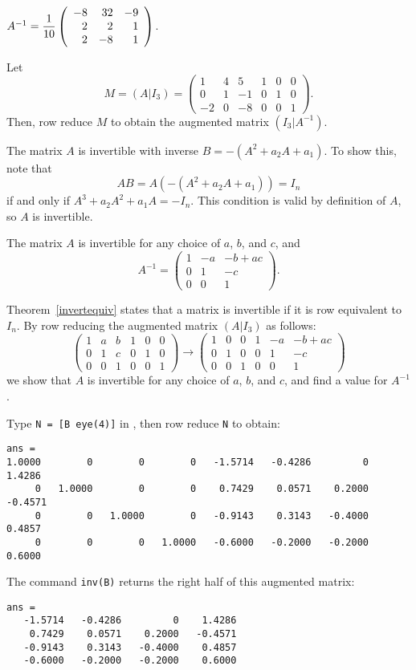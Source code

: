 \documentclass{ximera}
\begin{document}
 \ans
$A^{-1} = \displaystyle\frac{1}{10}\left(\begin{array}{rrr} -8 & 32 & -9 \\ 2 & 2 & 1 \\ 2 & -8 & 1\end{array}\right)$.

\soln Let
\[
M = (A|I_3) = \left(\begin{array}{rrr|rrr} 1 & 4 & 5 & 1 & 0 & 0 \\
0 & 1 & -1 & 0 & 1 & 0 \\
-2 & 0 & -8 & 0 & 0 & 1 \end{array}\right).
\]
Then, row reduce $M$ to obtain the augmented matrix $(I_3|A^{-1})$.

The matrix $A$ is invertible with inverse $B = -(A^2 + a_2A + a_1)$.
To show this, note that
\[ AB = A(-(A^2 + a_2A + a_1)) = I_n \]
if and only if $A^3 + a_2A^2 + a_1A = -I_n$.  This condition is valid
by definition of $A$, so $A$ is invertible.

\newpage
{}
\ans
The matrix $A$ is invertible for any choice of $a$, $b$, and $c$, and
\[
A^{-1} = \left(\begin{array}{rrc} 1 & -a & -b + ac \\ 0 & 1 & -c 
\\ 0 & 0 & 1 \end{array}\right).
\]

\soln Theorem~\ref{invertequiv} states that a matrix is invertible if
it is row equivalent to $I_n$.  By row reducing the augmented matrix
$(A|I_3)$ as follows:
\[
\left(\begin{array}{rrr|rrr} 1 & a & b & 1 & 0 & 0 \\
0 & 1 & c & 0 & 1 & 0 \\ 0 & 0 & 1 & 0 & 0 & 1
\end{array}\right) \rightarrow \left(\begin{array}{rrr|rrc}
1 & 0 & 0 & 1 & -a & -b + ac \\ 0 & 1 & 0 & 0 & 1 & -c \\
0 & 0 & 1 & 0 & 0 & 1 \end{array}\right)
\]
we show that $A$ is invertible for any choice of $a$, $b$, and
$c$, and find a value for $A^{-1}$.

Type {\tt N = [B eye(4)]} in \Matlabp, then row reduce {\tt N} to obtain:
\begin{verbatim}
ans =
1.0000        0        0        0   -1.5714   -0.4286         0    1.4286
     0   1.0000        0        0    0.7429    0.0571    0.2000   -0.4571
     0        0   1.0000        0   -0.9143    0.3143   -0.4000    0.4857
     0        0        0   1.0000   -0.6000   -0.2000   -0.2000    0.6000
\end{verbatim}
The command {\tt inv(B)} returns the right half of this augmented
matrix:
\begin{verbatim}
ans =
   -1.5714   -0.4286         0    1.4286
    0.7429    0.0571    0.2000   -0.4571
   -0.9143    0.3143   -0.4000    0.4857
   -0.6000   -0.2000   -0.2000    0.6000
\end{verbatim}
\end{document}
